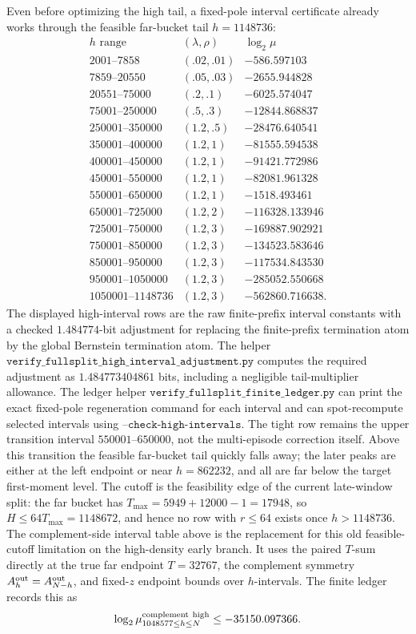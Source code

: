 Even before optimizing the high tail, a fixed-pole interval certificate already works through the feasible far-bucket
tail \(h=1148736\):
\[
\begin{array}{c|c|c}
h\text{ range} & (\lambda,\rho) & \log_2\mu\\
\hline
2001\text{--}7858 & (.02,.01) & -586.597103\\
7859\text{--}20550 & (.05,.03) & -2655.944828\\
20551\text{--}75000 & (.2,.1) & -6025.574047\\
75001\text{--}250000 & (.5,.3) & -12844.868837\\
250001\text{--}350000 & (1.2,.5) & -28476.640541\\
350001\text{--}400000 & (1.2,1) & -81555.594538\\
400001\text{--}450000 & (1.2,1) & -91421.772986\\
450001\text{--}550000 & (1.2,1) & -82081.961328\\
550001\text{--}650000 & (1.2,1) & -1518.493461\\
650001\text{--}725000 & (1.2,2) & -116328.133946\\
725001\text{--}750000 & (1.2,3) & -169887.902921\\
750001\text{--}850000 & (1.2,3) & -134523.583646\\
850001\text{--}950000 & (1.2,3) & -117534.843530\\
950001\text{--}1050000 & (1.2,3) & -285052.550668\\
1050001\text{--}1148736 & (1.2,3) & -562860.716638 .
\end{array}
\]
The displayed high-interval rows are the raw finite-prefix interval constants with a checked \(1.484774\)-bit
adjustment for replacing the finite-prefix termination atom by the global Bernstein termination atom.  The helper
\(\texttt{verify\_fullsplit\_high\_interval\_adjustment.py}\) computes the required adjustment as
\(1.484773404861\) bits, including a negligible tail-multiplier allowance.  The ledger helper
\(\texttt{verify\_fullsplit\_finite\_ledger.py}\) can print the exact fixed-pole regeneration command for each interval
and can spot-recompute selected intervals using \(\texttt{--check-high-intervals}\).
The tight row remains the upper transition interval \(550001\text{--}650000\), not the multi-episode correction itself.
Above this transition the feasible far-bucket tail quickly falls away; the later peaks are either at the left endpoint or
near \(h=862232\), and all are far below the target first-moment level.
The cutoff is the feasibility edge of the current late-window split: the far bucket has
\(T_{\max}=5949+12000-1=17948\), so \(H\le 64T_{\max}=1148672\), and hence no row with \(r\le64\) exists once
\(h>1148736\).
The complement-side interval table above is the replacement for this old feasible-cutoff limitation on the high-density
early branch.  It uses the paired \(T\)-sum directly at the true far endpoint \(T=32767\), the complement symmetry
\(A_h^{\rm out}=A_{N-h}^{\rm out}\), and fixed-\(z\) endpoint bounds over \(h\)-intervals.  The finite ledger records
this as
\[
\log_2\mu_{1048577\le h\le N}^{\rm complement\ high}\le -35150.097366.
\]

